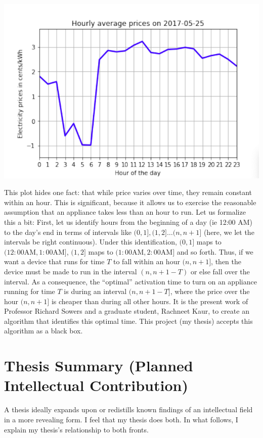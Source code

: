 \documentclass[a4paper]{article}
\begin{document}
    \includegraphics[width=0.7\paperwidth,height=0.7\paperheight,keepaspectratio]{../pictures/average_hourly_prices}

This plot hides one fact: that while price varies over time, they remain constant within an hour. This is significant, because it allows us to exercise the reasonable assumption that an appliance takes less than an hour to run. Let us formalize this a bit:
First, let us identify hours from the beginning of a day (ie 12:00 AM) to the day's end in terms of intervals like $(0,1], (1,2] \dots (n, n+1]$ (here, we let the intervals be right continuous). Under this identification, $(0,1]$ maps to $(12:00 \text{AM}, 1:00\text{AM}]$, $(1,2]$ maps to $(1:00 \text{AM}, 2:00\text{AM}]$ and so forth. Thus, if we want a device that runs for time $T$ to fall within an hour $(n, n+1]$, then the device must be made to run in the interval $(n, n+1 -T)$ or else fall over the interval. As a consequence, the ``optimal'' activation time to turn on an appliance running for time $T$ is during an interval $(n, n+1 - T]$, where the price over the hour $(n, n+1]$ is cheaper than during all other hours. It is the present work of Professor Richard Sowers and a graduate student, Rachneet Kaur, to create an algorithm that identifies this optimal time. This project (my thesis) accepts this algorithm as a black box.

\newpage


\section{Thesis Summary (Planned Intellectual Contribution)} 
A thesis ideally expands upon or redistills known findings of an intellectual field in a more revealing form. I feel that my thesis does both. In what follows, I explain my thesis's relationship to both fronts.
\end{document}
